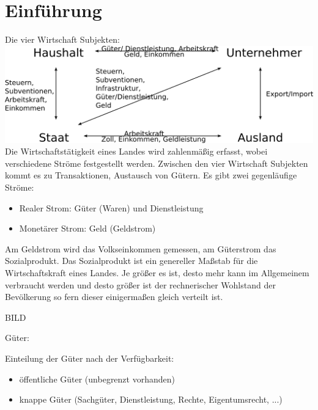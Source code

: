 \documentclass[a4paper]{report}
\begin{document}
\chapter{Einführung}

Die  vier Wirtschaft Subjekten:
\newline
\newline
\newline
\newline
\includegraphics[scale=0.8]{image/image1.png}
\newline
\newline
\newline
\newline
Die Wirtschaftstätigkeit eines Landes wird zahlenmäßig erfasst, wobei verschiedene Ströme festgestellt werden. Zwischen den vier Wirtschaft Subjekten kommt es zu Transaktionen, Austausch von Gütern. Es gibt zwei gegenläufige Ströme:

\begin{itemize}
\item Realer Strom: Güter (Waren) und Dienstleistung
\item Monetärer Strom: Geld (Geldstrom)
\end{itemize}

Am Geldstrom wird das Volkseinkommen gemessen, am Güterstrom das Sozialprodukt. Das Sozialprodukt ist ein genereller Maßstab für die Wirtschaftskraft eines Landes. Je größer es ist, desto mehr kann im Allgemeinem verbraucht werden und desto größer ist der rechnerischer Wohlstand der Bevölkerung so fern dieser einigermaßen gleich verteilt ist.

BILD

Güter:

Einteilung der Güter nach der Verfügbarkeit:

\begin{itemize}
\item öffentliche Güter (unbegrenzt vorhanden)
\item knappe Güter (Sachgüter, Dienstleistung, Rechte, Eigentumsrecht, ...)
\end{itemize}
\end{document}
